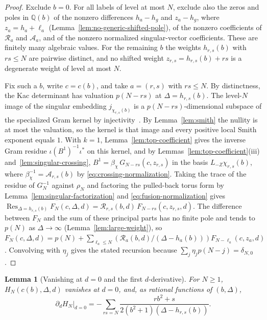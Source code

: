 \documentclass[twoside,10pt]{article}
\numberwithin{equation}{section}
\theoremstyle{slbody}
\newtheorem{lemma}[theorem]{Lemma}
\theoremstyle{definition}
\theoremstyle{remark}
\newcommand{\Res}{\operatorname{Res}}
\begin{document}
\begin{proof}
Exclude \(b=0\).  For all labels of level at most \(N\), exclude also the
zeros and poles in \(\mathbb Q(b)\) of the nonzero differences \(h_a-h_g\)
and \(z_a-h_g\), where \(z_a=h_a+\ell_a\)
(Lemma~\ref{lem:no-generic-shifted-pole}), of the nonzero
coefficients of \({\mathcal R}_a\) and \({\mathcal A}_a\), and of the
nonzero normalized singular-vector coefficients.  These are finitely many
algebraic values.  For the remaining \(b\) the weights \(h_{r,s}(b)\) with
\(rs\leq N\) are pairwise distinct, and no shifted weight
\(z_{r,s}=h_{r,s}(b)+rs\) is a degenerate weight of level at most \(N\).

Fix such a \(b\), write \(c=c(b)\), and take \(a=(r,s)\) with \(rs\leq N\).
By distinctness, the Kac determinant has valuation \(p(N-rs)\) at \(\Delta=h_{r,s}(b)\).
The level-\(N\) image of the singular embedding \(j_{\chi_{r,s}(b)}\) is a
\(p(N-rs)\)-dimensional subspace of the specialized Gram kernel by
injectivity~\cite[the paragraph preceding Corollary~5.2]{IoharaKoga2011}.
By Lemma~\ref{lem:smith} the nullity is at most the valuation, so the kernel
is that image and every positive local Smith exponent equals \(1\).
With \(k=1\), Lemma~\ref{lem:top-coefficient} gives the inverse Gram residue
\(\iota(B^1)^{-1}\iota^*\) on this kernel, and by
Lemmas~\ref{lem:top-coefficient}(iii) and~\ref{lem:singular-crossing},
\(B^1=\beta_{\chi}\,G_{N-rs}(c,z_{r,s})\) in the basis
\(L_{-Z}\chi_{r,s}(b)\), where
\(\beta_\chi^{-1}={\mathcal A}_{r,s}(b)\) by
\eqref{eq:crossing-normalization}.  Taking the trace of the residue of \(G_N^{-1}\) against \(\rho_N\) and
factoring the pulled-back torus form by Lemma~\ref{lem:singular-factorization}
and \eqref{eq:fusion-normalization} gives
\(\Res_{\Delta=h_{r,s}(b)}F_N(c,\Delta,d)={\mathcal R}_{r,s}(b,d)\,F_{N-rs}(c,z_{r,s},d)\).
The difference between \(F_N\) and the sum of these principal parts has no
finite pole and tends to \(p(N)\) as \(\Delta\to\infty\)
(Lemma~\ref{lem:large-weight}), so
\(F_N(c,\Delta,d)=p(N)+\sum_{\ell_a\leq N}({\mathcal R}_a(b,d)/(\Delta-h_a(b)))F_{N-\ell_a}(c,z_a,d)\).
Convolving with \(\eta_j\) gives the stated recursion because
\(\sum_j\eta_jp(N-j)=\delta_{N,0}\).
\end{proof}

\begin{lemma}[Vanishing at \(d=0\) and the first \(d\)-derivative]
\label{lem:d-derivatives}
For \(N\geq1\), \(H_N(c(b),\Delta,d)\) vanishes at \(d=0\), and, as
rational functions of \((b,\Delta)\),
\[
 \partial_dH_N\big|_{d=0}
 =-\sum_{rs=N}\frac{rb^2+s}{2(b^2+1)(\Delta-h_{r,s}(b))}.
\]
\end{lemma}
\end{document}
